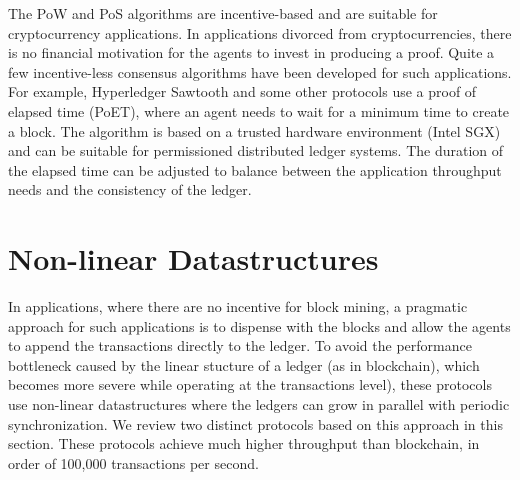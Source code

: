  
The PoW and PoS algorithms are incentive-based and are suitable for cryptocurrency applications. In applications divorced
from cryptocurrencies, there is no financial motivation for the agents to invest in producing a proof. Quite a few incentive-less 
consensus algorithms have been developed for such applications. For example, Hyperledger Sawtooth and some other protocols use 
a proof of elapsed time (PoET),
where an agent needs to wait for a minimum
time to create a block. The algorithm is based on a trusted hardware environment (Intel SGX) and can be suitable for permissioned 
distributed ledger systems. The duration of the elapsed time can be adjusted to balance between the application throughput needs and 
the consistency of the ledger.

\section{Non-linear Datastructures}

In applications, where there are no incentive for block mining, a pragmatic approach for such applications is to dispense with the 
blocks and allow the agents to append the transactions directly to the ledger. To avoid the performance bottleneck caused by the 
linear stucture of a ledger (as in blockchain), which becomes more severe while operating at the transactions level), these 
protocols use non-linear datastructures where the ledgers can grow in parallel with periodic synchronization. We review two distinct 
protocols based on this approach in this section. These protocols achieve much higher throughput than blockchain, in order of 100,000 
transactions per second.

